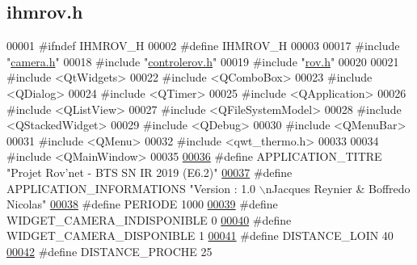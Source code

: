 \hypertarget{ihmrov_8h_source}{}\subsection{ihmrov.\+h}

\begin{DoxyCode}
00001 \textcolor{preprocessor}{#ifndef IHMROV\_H}
00002 \textcolor{preprocessor}{#define IHMROV\_H}
00003 
00017 \textcolor{preprocessor}{#include "\hyperlink{camera_8h}{camera.h}"}
00018 \textcolor{preprocessor}{#include "\hyperlink{controlerov_8h}{controlerov.h}"}
00019 \textcolor{preprocessor}{#include "\hyperlink{rov_8h}{rov.h}"}
00020 
00021 \textcolor{preprocessor}{#include <QtWidgets>}
00022 \textcolor{preprocessor}{#include <QComboBox>}
00023 \textcolor{preprocessor}{#include <QDialog>}
00024 \textcolor{preprocessor}{#include <QTimer>}
00025 \textcolor{preprocessor}{#include <QApplication>}
00026 \textcolor{preprocessor}{#include <QListView>}
00027 \textcolor{preprocessor}{#include <QFileSystemModel>}
00028 \textcolor{preprocessor}{#include <QStackedWidget>}
00029 \textcolor{preprocessor}{#include <QDebug>}
00030 \textcolor{preprocessor}{#include <QMenuBar>}
00031 \textcolor{preprocessor}{#include <QMenu>}
00032 \textcolor{preprocessor}{#include <qwt\_thermo.h>}
00033 
00034 \textcolor{preprocessor}{#include <QMainWindow>}
00035 
\hyperlink{ihmrov_8h_ab599af93fd63f0c5df05b03aa7448eb9}{00036} \textcolor{preprocessor}{#define APPLICATION\_TITRE           "Projet Rov'net - BTS SN IR 2019 (E6.2)"}
\hyperlink{ihmrov_8h_afbc72a1675bd9c5173820a3b874f1fa6}{00037} \textcolor{preprocessor}{#define APPLICATION\_INFORMATIONS    "Version : 1.0 \(\backslash\)nJacques Reynier & Boffredo Nicolas"}
\hyperlink{ihmrov_8h_ad0750d12e2f5f404ec458d4066a53fa4}{00038} \textcolor{preprocessor}{#define PERIODE                     1000}
\hyperlink{ihmrov_8h_a811ff9a6b410f748f13757277a45d1cd}{00039} \textcolor{preprocessor}{#define WIDGET\_CAMERA\_INDISPONIBLE  0}
\hyperlink{ihmrov_8h_a01e28fb5361c4789cfefd3682ad1c25b}{00040} \textcolor{preprocessor}{#define WIDGET\_CAMERA\_DISPONIBLE    1}
\hyperlink{ihmrov_8h_aa986e54d0a0e08e8e32fc991c2186c09}{00041} \textcolor{preprocessor}{#define DISTANCE\_LOIN               40}
\hyperlink{ihmrov_8h_a90b48491a3e4dbe15f8255efe530e41a}{00042} \textcolor{preprocessor}{#define DISTANCE\_PROCHE             25}

\end{DoxyCode}
